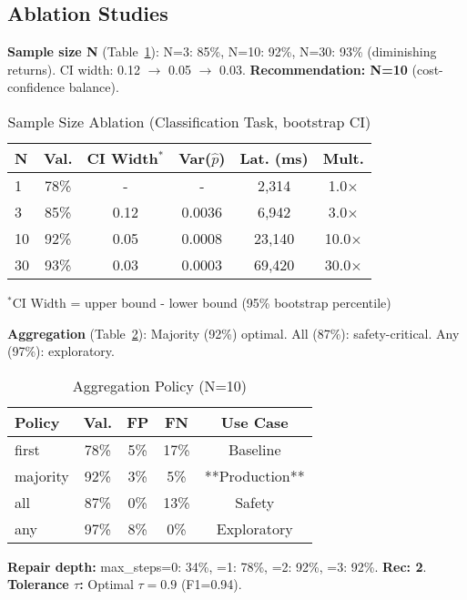 \documentclass[sigconf]{acmart}
\begin{document}
\subsection{Ablation Studies}

\textbf{Sample size N} (Table~\ref{tab:ablation_n}): N=3: 85\%, N=10: 92\%, N=30: 93\% (diminishing returns). CI width: 0.12 \(\to\) 0.05 \(\to\) 0.03. \textbf{Recommendation: N=10} (cost-confidence balance).

\begin{table}[H]
\centering
\caption{Sample Size Ablation (Classification Task, bootstrap CI)}
\label{tab:ablation_n}
\scriptsize
\begin{tabular}{@{}lccccc@{}}
\toprule
\textbf{N} & \textbf{Val.} & \textbf{CI Width}\(^*\) & \textbf{Var(\(\hat{p}\))} & \textbf{Lat. (ms)} & \textbf{Mult.} \\
\midrule
1 & 78\% & - & - & 2,314 & 1.0\(\times\) \\
3 & 85\% & 0.12 & 0.0036 & 6,942 & 3.0\(\times\) \\
10 & 92\% & 0.05 & 0.0008 & 23,140 & 10.0\(\times\) \\
30 & 93\% & 0.03 & 0.0003 & 69,420 & 30.0\(\times\) \\
\bottomrule
\end{tabular}
\vspace{1mm}
\scriptsize\(^*\)CI Width = upper bound - lower bound (95\% bootstrap percentile)
\end{table}

\textbf{Aggregation} (Table~\ref{tab:ablation_agg}): Majority (92\%) optimal. All (87\%): safety-critical. Any (97\%): exploratory.

\begin{table}[H]
\centering
\caption{Aggregation Policy (N=10)}
\label{tab:ablation_agg}
\scriptsize
\begin{tabular}{@{}lcccc@{}}
\toprule
\textbf{Policy} & \textbf{Val.} & \textbf{FP} & \textbf{FN} & \textbf{Use Case} \\
\midrule
first & 78\% & 5\% & 17\% & Baseline \\
majority & 92\% & 3\% & 5\% & **Production** \\
all & 87\% & 0\% & 13\% & Safety \\
any & 97\% & 8\% & 0\% & Exploratory \\
\bottomrule
\end{tabular}
\end{table}

\textbf{Repair depth:} max\_steps=0: 34\%, =1: 78\%, =2: 92\%, =3: 92\%. \textbf{Rec: 2}. \textbf{Tolerance \( \tau \):} Optimal \( \tau = 0.9 \) (F1=0.94).
\end{document}
